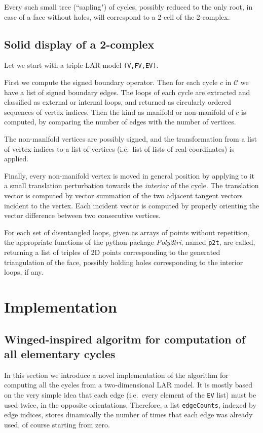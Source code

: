 \documentclass[11pt,oneside]{article}	%
\begin{document}
Every such small tree (``sapling") of cycles, possibly reduced to the only root, in case of a face without holes, 
will correspond to a 2-cell of the 2-complex.


\subsection{Solid display of a 2-complex}

Let we start with a triple LAR model \texttt{(V,FV,EV)}.

First we compute the signed boundary operator. Then for each cycle $c$ in $\mathcal{C}$ we have a list of signed boundary edges. The loops of each cycle are extracted and classified as external or internal loops, and returned  as circularly ordered sequences of vertex indices.  Then the kind as manifold or non-manifold of $c$ is computed, by comparing the number of edges with the number of vertices. 

The non-manifold vertices are possibly signed, and the transformation from a list of vertex indices to a list of vertices (i.e.~list of lists of real coordinates) is applied.

Finally, every non-manifold vertex is moved in general position by applying to it a small translation perturbation towards the \emph{interior} of the cycle. The translation vector is computed by vector summation of the two adjacent tangent vectors incident to the vertex. Each incident vector is computed by properly orienting the vector difference between two consecutive vertices. 

For each set of disentangled loops, given as arrays of points without repetition, the appropriate functions of the python package \emph{Poly2tri}, named \texttt{p2t}, are called, returning a list of triples of 2D points corresponding to the generated triangulation of the face, possibly holding holes corresponding to the interior loops, if any.





\section{Implementation}


\subsection{Winged-inspired algoritm for computation of all elementary cycles}
In this section we introduce a novel implementation of the algorithm for computing all the cycles  from a two-dimensional LAR model. It is mostly based on the very simple idea that each edge (i.e.~every element of the \texttt{EV} list) must be used twice, in the opposite orientations. Therefore, a list \texttt{edgeCounts}, indexed by edge indices, stores dinamically the number of times that each edge was already used, of course starting from zero. 
    
\end{document}
